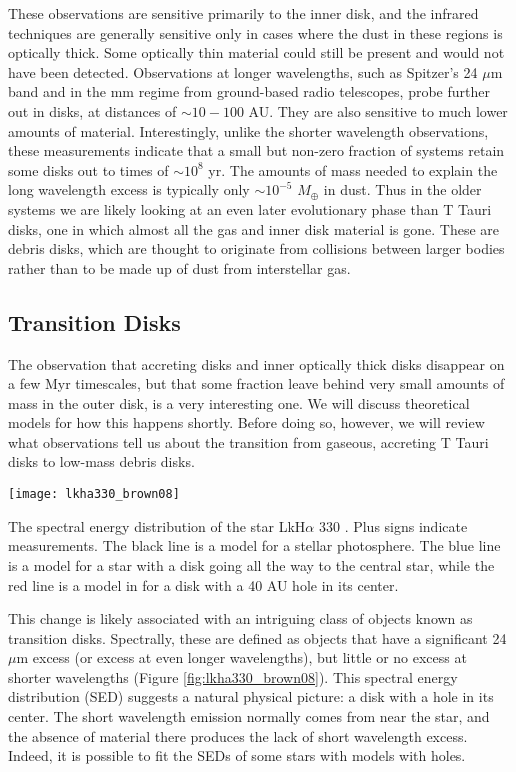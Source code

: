 These observations are sensitive primarily to the inner disk, and the infrared techniques are generally sensitive only in cases where the dust in these regions is optically thick. Some optically thin material could still be present and would not have been detected. Observations at longer wavelengths, such as Spitzer's 24 $\mu$m band and in the mm regime from ground-based radio telescopes, probe further out in disks, at distances of $\sim 10-100$ AU. They are also sensitive to much lower amounts of material. Interestingly, unlike the shorter wavelength observations, these measurements indicate that a small but non-zero fraction of systems retain some disks out to times of $\sim 10^8$ yr. The amounts of mass needed to explain the long wavelength excess is typically only $\sim 10^{-5}$ $M_{\oplus}$ in dust. Thus in the older systems we are likely looking at an even later evolutionary phase than T Tauri disks, one in which almost all the gas and inner disk material is gone. These are debris disks, which are thought to originate from collisions between larger bodies rather than to be made up of dust from interstellar gas.

\subsection{Transition Disks}

The observation that accreting disks and inner optically thick disks disappear on a few Myr timescales, but that some fraction leave behind very small amounts of mass in the outer disk, is a very interesting one. We will discuss theoretical models for how this happens shortly. Before doing so, however, we will review what observations tell us about the transition from gaseous, accreting T Tauri disks to low-mass debris disks.

\begin{marginfigure}
\texttt{[image: lkha330\_brown08]}
\caption[Spectral energy distribution of LkH$\alpha$ 330]{
\label{fig:lkha330_brown08}
The spectral energy distribution of the star LkH$\alpha$ 330 \citep{brown08a}. Plus signs indicate measurements. The black line is a model for a stellar photosphere. The blue line is a model for a star with a disk going all the way to the central star, while the red line is a model in for a disk with a 40 AU hole in its center.
}
\end{marginfigure}

This change is likely associated with an intriguing class of objects known as transition disks. Spectrally, these are defined as objects that have a significant 24 $\mu$m excess (or excess at even longer wavelengths), but little or no excess at shorter wavelengths (Figure \ref{fig:lkha330_brown08}). This spectral energy distribution (SED) suggests a natural physical picture: a disk with a hole in its center. The short wavelength emission normally comes from near the star, and the absence of material there produces the lack of short wavelength excess. Indeed, it is possible to fit the SEDs of some stars with models with holes.

